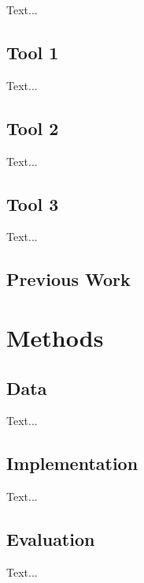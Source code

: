 \documentclass{kththesis}
\begin{document}
Text...

\section{Tool 1}
Text...

\section{Tool 2}
Text...

\section{Tool 3}
Text...

\section{Previous Work}

\chapter{Methods}

\section{Data}
Text...

\section{Implementation}
Text...

\section{Evaluation}
Text...

\printbibliography

\end{document}
